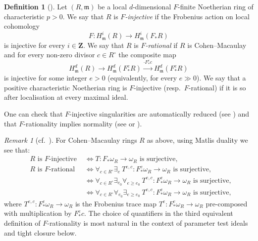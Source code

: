 \documentclass[letterpaper,11pt]{amsart}
\theoremstyle{plain}
\theoremstyle{definition}
\newtheorem{defi}[thm]{Definition}
\theoremstyle{remark}
\newtheorem{rmk}[thm]{Remark}
\def\Z{{\mathbf Z}}
\def\frm{\mathfrak{m}}
\begin{document}
\begin{defi}[{\cite[Definition 1.2]{Srinivas-Takagi}}]
Let $(R,\frm)$ be a local $d$-dimensional $F$-finite Noetherian ring of characteristic $p>0$. We say that $R$ is \emph{$F$-injective} if the Frobenius action on local cohomology
\[
F \colon H^i_\frm(R) \to H^i_\frm(F_*R)
\]
is injective for every $i \in \Z$. We say that $R$ is \emph{$F$-rational} if $R$ is Cohen--Macaulay and for every non-zero divisor $c \in R^\circ$ the composite map
\begin{equation*}
H^d_\frm(R) \to H^d_\frm(F^e_*R) \xrightarrow{\cdot F^e_* c } H^d_\frm(F^e_*R)
\end{equation*}
is injective for some integer $e>0$ (equivalently, for every $e \gg 0$). We say that a positive characteristic Noetherian ring is $F$-injective (resp.\ $F$-rational) if it is so after localisation at every maximal ideal.
\end{defi}

One can check that $F$-injective singularities are automatically reduced (see \cite[Corollary 3.5]{DM24}) and that $F$-rationality implies normality (see \cite[Lemma 2.34]{bstAlt} or  \cite[Corollary 2.14 and Proposition 3.9]{TW18}).


\begin{rmk}[{cf.\ \cite[Proposition 3.19]{TW18}}] \label{rmk:dualDefFSing}
For Cohen--Macaulay rings $R$ as above, using Matlis duality we see that:
\begin{align*}
\text{ $R$ is $F$-injective } &\iff T \colon F_*\omega_R \to \omega_R \text{ is surjective, }\\
\text{ $R$ is $F$-rational } &\iff \forall_{c \in R^\circ} \exists_{e}\ T^{e,c} \colon F^e_*\omega_R \to \omega_R \text{ is surjective},\\
&\iff \forall_{c \in R^\circ} \exists_{e_0} \forall_{e \geq e_0}\ T^{e,c} \colon F^e_*\omega_R \to \omega_R \text{ is surjective},\\
&\iff \forall_{c \in R^\circ} \forall_{e_0} \exists_{e \geq e_0}\ T^{e,c} \colon F^e_*\omega_R \to \omega_R \text{ is surjective},
\end{align*}
where $T^{e,c} \colon F^e_*\omega_R \to \omega_R$ is the Frobenius trace map $T^e \colon F^e_*\omega_R \to \omega_R$ pre-composed with multiplication by $F^e_*c$. The choice of quantifiers in the third equivalent definition of $F$-rationality is most natural in the context of parameter test ideals and tight closure below. 
\end{rmk}
\end{document}
